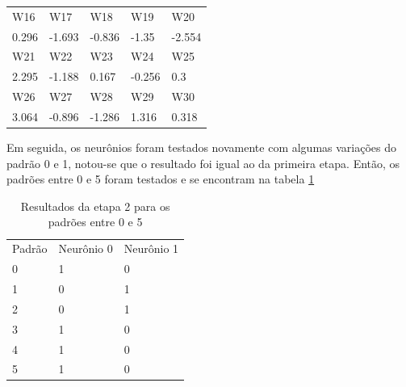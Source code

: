 \documentclass[11pt]{article}
\begin{document}
\begin{table}[h]
\begin{tabular}{lllll}
  \rowcolor[HTML]{000000}
  {\color[HTML]{FFFFFF} W16}                        & {\color[HTML]{FFFFFF} W17} & {\color[HTML]{FFFFFF} W18} & {\color[HTML]{FFFFFF} W19} & {\color[HTML]{FFFFFF} W20} \\
  0.296                                             & -1.693                     & -0.836                     & -1.35                      & -2.554                     \\
  \rowcolor[HTML]{000000}
  {\color[HTML]{FFFFFF} W21}                        & {\color[HTML]{FFFFFF} W22} & {\color[HTML]{FFFFFF} W23} & {\color[HTML]{FFFFFF} W24} & {\color[HTML]{FFFFFF} W25} \\
  2.295                                             & -1.188                     & 0.167                      & -0.256                     & 0.3                        \\
  \rowcolor[HTML]{000000}
  {\color[HTML]{FFFFFF} W26}                        & {\color[HTML]{FFFFFF} W27} & {\color[HTML]{FFFFFF} W28} & {\color[HTML]{FFFFFF} W29} & {\color[HTML]{FFFFFF} W30} \\
  3.064                                             & -0.896                     & -1.286                     & 1.316                      & 0.318
  \end{tabular}
\end{table}

Em seguida, os neurônios foram testados novamente com algumas variações do
padrão 0 e 1, notou-se que o resultado foi igual ao da primeira etapa. Então, os
padrões entre 0 e 5 foram testados e se encontram na tabela \ref{tab:res01_2}

\begin{table}[]
\centering
\caption{Resultados da etapa 2 para os padrões entre 0 e 5}
\label{tab:res01_2}
\begin{tabular}{lll}
\rowcolor[HTML]{000000}
{\color[HTML]{FFFFFF} Padrão} & {\color[HTML]{FFFFFF} Neurônio 0} & {\color[HTML]{FFFFFF} Neurônio 1} \\
0                             & 1                                 & 0                                 \\
1                             & 0                                 & 1                                 \\
2                             & 0                                 & 1                                 \\
3                             & 1                                 & 0                                 \\
4                             & 1                                 & 0                                 \\
5                             & 1                                 & 0
\end{tabular}
\end{table}
\end{document}

